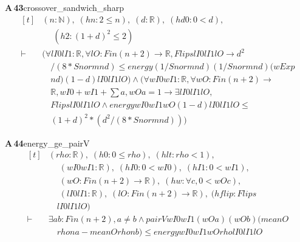 \documentclass[conference]{IEEEtran}
\theoremstyle{definition}
\newcommand{\lean}[1]{\textsf{\footnotesize #1}}
\begin{document}
\noindent\textbf{A\,43}\quad\lean{crossover\_sandwich\_sharp}
{\footnotesize\[ \begin{aligned}[t]
&(\mathit{n} : \mathbb{N} ),\; (\mathit{hn} : 2 \leq \mathit{n}),\; (\mathit{d} : \mathbb{R} ),\; (\mathit{hd0} : 0 < \mathit{d}),\\
&\quad \; (\mathit{h2} : (1+\mathit{d})^{2} \leq 2)\\
\vdash\;&(\forall \mathit{lI0} \mathit{lI1} : \mathbb{R} , \forall \mathit{lO} : \mathit{Fin} (\mathit{n}+2) \to \mathbb{R} , \mathit{Flips} \mathit{lI0} \mathit{lI1} \mathit{lO} \to \mathit{d}^{2}\\
&\quad /(8*\mathit{Snorm} \mathit{n} \mathit{d}) \leq \mathit{energy} (1/\mathit{Snorm} \mathit{n} \mathit{d}) (1/\mathit{Snorm} \mathit{n} \mathit{d}) (\mathit{wExp}\\
&\quad \mathit{n} \mathit{d}) (1-\mathit{d}) \mathit{lI0} \mathit{lI1} \mathit{lO}) \wedge (\forall \mathit{wI0} \mathit{wI1} : \mathbb{R} , \forall \mathit{wO} : \mathit{Fin} (\mathit{n}+2) \to\\
&\quad \mathbb{R} , \mathit{wI0} + \mathit{wI1} + \textstyle\sum \mathit{a}, \mathit{wO} \mathit{a} = 1 \to \exists \mathit{lI0} \mathit{lI1} \mathit{lO},\\
&\quad \mathit{Flips} \mathit{lI0} \mathit{lI1} \mathit{lO} \wedge \mathit{energy} \mathit{wI0} \mathit{wI1} \mathit{wO} (1-\mathit{d}) \mathit{lI0} \mathit{lI1} \mathit{lO} \leq\\
&\quad (1+\mathit{d})^{2}*(\mathit{d}^{2}/(8*\mathit{Snorm} \mathit{n} \mathit{d})))
\end{aligned} \]}

\noindent\textbf{A\,44}\quad\lean{energy\_ge\_pairV}
{\footnotesize\[ \begin{aligned}[t]
&(\mathit{rho} : \mathbb{R} ),\; (\mathit{h0} : 0 \leq \mathit{rho}),\; (\mathit{hlt} : \mathit{rho} < 1),\\
&\quad \; (\mathit{wI0} \mathit{wI1} : \mathbb{R} ),\; (\mathit{hI0} : 0 < \mathit{wI0}),\; (\mathit{hI1} : 0 < \mathit{wI1}),\\
&\quad \; (\mathit{wO} : \mathit{Fin} (\mathit{n}+2) \to \mathbb{R} ),\; (\mathit{hw} : \forall \mathit{c}, 0 < \mathit{wO} \mathit{c}),\\
&\quad \; (\mathit{lI0} \mathit{lI1} : \mathbb{R} ),\; (\mathit{lO} : \mathit{Fin} (\mathit{n}+2) \to \mathbb{R} ),\; (\mathit{hflip} : \mathit{Flips}\\
&\quad \mathit{lI0} \mathit{lI1} \mathit{lO})\\
\vdash\;&\exists \mathit{a} \mathit{b} : \mathit{Fin} (\mathit{n}+2), \mathit{a} \neq \mathit{b} \wedge \mathit{pairV} \mathit{wI0} \mathit{wI1} (\mathit{wO} \mathit{a}) (\mathit{wO} \mathit{b}) (\mathit{meanO}\\
&\quad \mathit{rho} \mathit{n} \mathit{a} - \mathit{meanO} \mathit{rho} \mathit{n} \mathit{b}) \leq \mathit{energy} \mathit{wI0} \mathit{wI1} \mathit{wO} \mathit{rho} \mathit{lI0} \mathit{lI1} \mathit{lO}
\end{aligned} \]}
\end{document}
